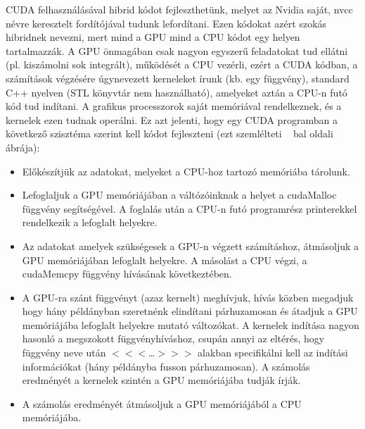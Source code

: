 \documentclass[11pt,a4paper]{article}
\numberwithin{equation}{subsection}
\numberwithin{figure}{section}
\begin{document}
CUDA felhasználásával hibrid kódot fejleszthetünk, melyet az Nvidia saját, nvcc névre keresztelt fordítójával tudunk lefordítani. Ezen kódokat azért szokás hibridnek nevezni, mert mind a GPU mind a CPU kódot egy helyen tartalmazzák. A GPU önmagában csak nagyon egyszerű feladatokat tud ellátni (pl. kiszámolni sok integrált), működését a CPU vezérli, ezért a CUDA kódban, a számítások végzésére úgynevezett kerneleket írunk (kb. egy függvény), standard C++ nyelven (STL könyvtár nem használható), amelyeket aztán a CPU-n futó kód tud indítani. A grafikus processzorok saját memóriával rendelkeznek, és a kernelek ezen tudnak operálni. Ez azt jelenti, hogy egy CUDA programban a következő szisztéma szerint kell kódot fejleszteni (ezt szemlélteti ~ bal oldali ábrája):  
\begin{itemize}
\item Előkészítjük az adatokat, melyeket a CPU-hoz tartozó memóriába tárolunk.
\item Lefoglaljuk a GPU memóriájában a váltózóinknak a helyet a cudaMalloc függvény segítségével. A foglalás után a CPU-n futó programrész printerekkel rendelkezik a lefoglalt helyekre.
\item Az adatokat amelyek szükségesek a GPU-n végzett számításhoz, átmásoljuk a GPU memóriájában lefoglalt helyekre. A másolást a CPU végzi, a cudaMemcpy függvény hívásának következtében.
\item A GPU-ra szánt függvényt (azaz kernelt) meghívjuk, hívás közben megadjuk hogy hány példányban szeretnénk elindítani párhuzamosan és átadjuk a GPU memóriájába lefoglalt helyekre mutató változókat. A kernelek indítása nagyon hasonló a megszokott függvényhíváshoz, csupán annyi az eltérés, hogy függvény neve után \(<\!\!<\!\!<\)\dots\(>\!\!>\!\!>\) alakban specifikálni kell az indítási információkat (hány példányba fusson párhuzamosan). A számolás eredményét a kernelek szintén a GPU memóriájába tudják írják.
\item A számolás eredményét átmásoljuk a GPU memóriájából a CPU memóriájába.
\end{itemize}  
\end{document}
